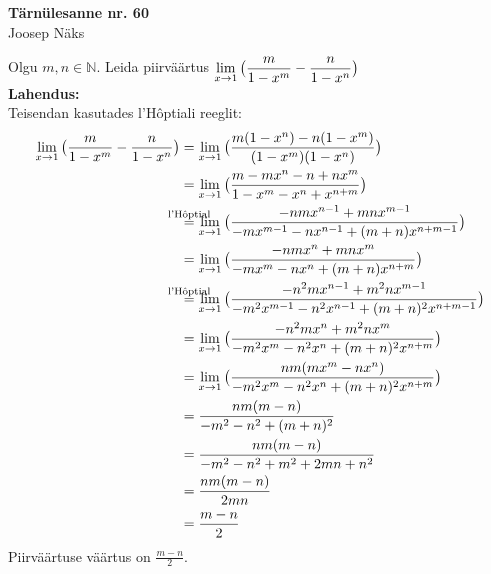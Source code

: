 \documentclass{article}
\newcommand\myeq{\stackrel{\mathclap{\scriptsize\mbox{l'H\^optial}}}{=}}
\begin{document}
\begin{center}
\Large\textbf{T\"arn\"ulesanne nr. 60}\\
\small{Joosep Näks}
\end{center}
Olgu $m,n\in \mathbb{N}$. Leida piirväärtus $\displaystyle\lim_{x\to1}\big{(}\frac{m}{1-x^m}-\frac{n}{1-x^n}\big)$\\
\textbf{Lahendus:}\\
Teisendan kasutades l'H\^optiali reeglit: 
\begin{equation*}
\begin{aligned}
\lim_{x\to1}\big{(}\frac{m}{1-x^m}-\frac{n}{1-x^n}\big)&=\lim_{x\to1}\big{(}\frac{m(1-x^n)-n(1-x^m)}{(1-x^m)(1-x^n)}\big)\\
&=\lim_{x\to1}\big{(}\frac{m-mx^n-n+nx^m}{1-x^m-x^n+x^{n+m}}\big)\\
&\myeq\lim_{x\to1}\big{(}\frac{-nmx^{n-1}+mnx^{m-1}}{-mx^{m-1}-nx^{n-1}+(m+n)x^{n+m-1}}\big)\\
&=\lim_{x\to1}\big{(}\frac{-nmx^n+mnx^m}{-mx^m-nx^n+(m+n)x^{n+m}}\big)\\
&\myeq\lim_{x\to1}\big{(}\frac{-n^2mx^{n-1}+m^2nx^{m-1}}{-m^2x^{m-1}-n^2x^{n-1}+(m+n)^2x^{n+m-1}}\big)\\
&=\lim_{x\to1}\big{(}\frac{-n^2mx^n+m^2nx^m}{-m^2x^m-n^2x^n+(m+n)^2x^{n+m}}\big)\\
&=\lim_{x\to1}\big{(}\frac{nm(mx^m-nx^n)}{-m^2x^m-n^2x^n+(m+n)^2x^{n+m}}\big)\\
&=\frac{nm(m-n)}{-m^2-n^2+(m+n)^2}\\
&=\frac{nm(m-n)}{-m^2-n^2+m^2+2mn+n^2}\\
&=\frac{nm(m-n)}{2mn}\\
&=\frac{m-n}{2}\\
\end{aligned}
\end{equation*}
Piirväärtuse väärtus on $\frac{m-n}{2}$.
\end{document}
